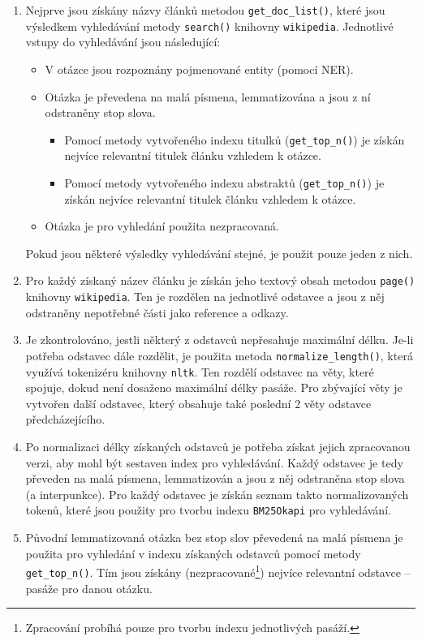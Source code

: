 \begin{enumerate}
    \item Nejprve jsou získány názvy článků metodou \texttt{get\_doc\_list()}, které jsou výsledkem vyhledávání metody \texttt{search()} knihovny \texttt{wikipedia}. Jednotlivé vstupy do vyhledávání jsou následující:
    \begin{itemize}
        \item V otázce jsou rozpoznány pojmenované entity (pomocí NER).
        \item Otázka je převedena na malá písmena, lemmatizována a jsou z ní odstraněny stop slova.
        \begin{itemize}
            \item Pomocí metody vytvořeného indexu titulků (\texttt{get\_top\_n()}) je získán nejvíce relevantní titulek článku vzhledem k otázce.
            \item Pomocí metody vytvořeného indexu abstraktů (\texttt{get\_top\_n()}) je získán nejvíce relevantní titulek článku vzhledem k otázce.
        \end{itemize}
        \item Otázka je pro vyhledání použita nezpracovaná.
    \end{itemize}
    Pokud jsou některé výsledky vyhledávání stejné, je použit pouze jeden z nich.
    
    \item Pro každý získaný název článku je získán jeho textový obsah metodou \texttt{page()} kni\-hovny \texttt{wikipedia}. Ten je rozdělen na jednotlivé odstavce a jsou z něj odstraněny nepotřebné části jako reference a odkazy.
    
    \item Je zkontrolováno, jestli některý z odstavců nepřesahuje maximální délku. Je-li potřeba odstavec dále rozdělit, je použita metoda \texttt{normalize\_length()}, která využívá tokenizéru knihovny \texttt{nltk}. Ten rozdělí odstavec na věty, které spojuje, dokud není dosaženo maximální délky pasáže. Pro zbývající věty je vytvořen další odstavec, který obsahuje také poslední 2 věty odstavce předcházejícího.
    
    \item Po normalizaci délky získaných odstavců je potřeba získat jejich zpracovanou verzi, aby mohl být sestaven index pro vyhledávání. Každý odstavec je tedy převeden na malá písmena, lemmatizován a jsou z něj odstraněna stop slova (a interpunkce). Pro každý odstavec je získán seznam takto normalizovaných tokenů, které jsou použity pro tvorbu indexu \texttt{BM25Okapi} pro vyhledávání.
    
    \item Původní lemmatizovaná otázka bez stop slov převedená na malá písmena je použita pro vyhledání v indexu získaných odstavců pomocí metody \texttt{get\_top\_n()}. Tím jsou získány (nezpracované\footnote{Zpracování probíhá pouze pro tvorbu indexu jednotlivých pasáží.}) nejvíce relevantní odstavce -- pasáže pro danou otázku.
\end{enumerate}

